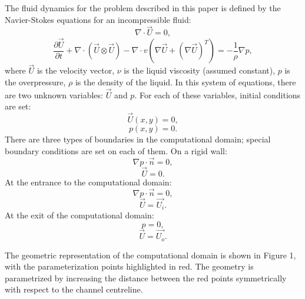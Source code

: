 \documentclass{aip-cp}
\begin{document}
The fluid dynamics for the problem described in this paper is defined by the Navier-Stokes equations for an incompressible fluid:
\[
\nabla \cdot \vec{U} = 0,
\]
\[
\frac{\partial \vec{U}}{\partial t} + \nabla \cdot \left( \vec{U} \otimes \vec{U}\right) - \nabla \cdot v \left( \nabla \vec{U} + (\nabla \vec{U})^T\right) = - \frac{1}{\rho} \nabla p,
\]
where $\vec{U}$ is the velocity vector, $\nu$  is the liquid viscosity (assumed constant), $p$  is the overpressure, $\rho$ is the density of the liquid. In this system of equations, there are two unknown variables: $\vec{U}$  and $p$. For each of these variables, initial conditions are set: 
\[
\vec{U}(x,y) = 0,
\]
\[
p(x,y) = 0.
\]
There are three types of boundaries in the computational domain; special boundary conditions are set on each of them. 
On a rigid wall:
\[
\nabla p \cdot \vec{n} = 0,
\]
\[
\vec{U} = 0.
\]
At the entrance to the computational domain:
\[
\nabla p \cdot \vec{n} = 0,
\]
\[
\vec{U} = \vec{U_i}.
\]
At the exit of the computational domain:
\[
 p = 0,
\]
\[
\vec{U} = \vec{U_o}.
\]

The geometric representation of the computational domain is shown in Figure 1, with the parameterization points highlighted in red. The geometry is parametrized by increasing the distance between the red points symmetrically with respect to the channel centreline. 
\end{document}
